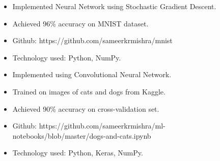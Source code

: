 \documentclass[a4paper,10pt]{simpleresume}
\begin{document}
\begin{itemize}
    \item Implemented Neural Network using Stochastic Gradient Descent.
    \item Achieved 96\% accuracy on MNIST dataset.
    \item Github: https://github.com/sameerkrmishra/mnist
    \item Technology used: Python, NumPy.
\end{itemize}
\begin{itemize}
    \item Implemented using Convolutional Neural Network.
    \item Trained on images of cats and dogs from Kaggle.
    \item Achieved 90\% accuracy on cross-validation set.
    \item Github: https://github.com/sameerkrmishra/ml- notebooks/blob/master/dogs-and-cats.ipynb
    \item Technology used: Python, Keras, NumPy.
\end{itemize}
\end{document}
